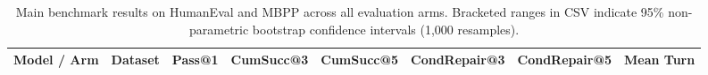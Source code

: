 \begin{table}[t]
\centering\small
\begin{tabular}{llcccccc}
\toprule
\textbf{Model / Arm} & \textbf{Dataset} & \textbf{Pass@1} & \textbf{CumSucc@3} & \textbf{CumSucc@5} & \textbf{CondRepair@3} & \textbf{CondRepair@5} & \textbf{Mean Turn} \\
\midrule
\bottomrule
\end{tabular}
\caption{Main benchmark results on HumanEval and MBPP across all evaluation arms. Bracketed ranges in CSV indicate 95\% non-parametric bootstrap confidence intervals (1,000 resamples).}
\label{tab:main_results}
\end{table}
